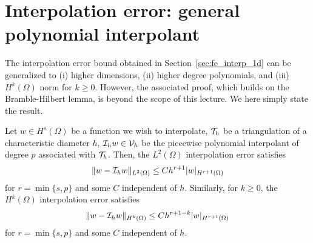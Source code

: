 \section{Interpolation error: general polynomial interpolant}
The interpolation error bound obtained in Section~\ref{sec:fe_interp_1d} can be generalized to (i) higher dimensions, (ii) higher degree polynomials, and (iii) $H^k(\Omega)$ norm for $k \geq 0$.  However, the associated proof, which builds on the Bramble-Hilbert lemma, is beyond the scope of this lecture.  We here simply state the result.
\begin{proposition}
Let $w \in H^s(\Omega)$ be a function we wish to interpolate, $\mathcal{T}_h$ be a triangulation of a characteristic diameter $h$, $\mathcal{I}_h w \in \mathcal{V}_h$ be the piecewise polynomial interpolant of degree $p$ associated with $\mathcal{T}_h$. Then, the $L^2(\Omega)$ interpolation error satisfies
\begin{align*}
  \| w - \mathcal{I}_h w \|_{L^2(\Omega)} \leq C h^{r+1} | w |_{H^{r+1}(\Omega)}
\end{align*}
for $r = \min\{ s,p \}$ and some $C$ independent of $h$. Similarly, for $k \geq 0$, the $H^k(\Omega)$ interpolation error satisfies 
\begin{align*}
  \| w - \mathcal{I}_h w \|_{H^k(\Omega)} \leq C h^{r+1-k} | w |_{H^{r+1}(\Omega)}
\end{align*}
for $r = \min\{ s,p \}$ and some $C$ independent of $h$.
\end{proposition}









